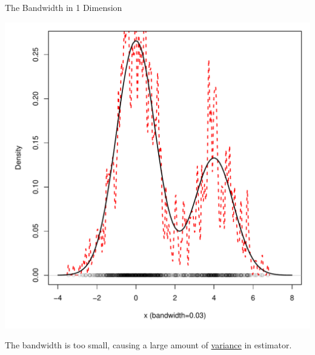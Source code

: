 \documentclass[12pt]{beamer}
\begin{document}
\begin{frame}{The Bandwidth in 1 Dimension}


  \begin{center}
    \includegraphics[scale=0.4]{figs/density1_1.pdf}
    \end{center}

\vspace{-.2in}

\begin{center}
    The bandwidth is too small, causing a large amount of \underline{variance} in estimator.
    \end{center}
  
\end{frame}
\end{document}
